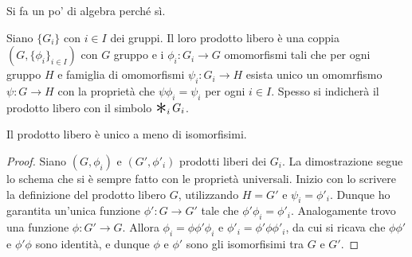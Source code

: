 Si fa un po' di algebra perch\'e s\`i.

\begin{defn}
    Siano $\{G_i\}$ con $i\in I$ dei gruppi. Il loro prodotto libero \`e una coppia $(G, \{\phi_i\}_{i\in I})$ con $G$ gruppo e i $\phi_i\colon G_i\longrightarrow G$ omomorfismi tali che per ogni gruppo $H$ e famiglia di omomorfismi $\psi_i\colon G_i \longrightarrow H$ esista unico un omomrfismo $\psi\colon G\longrightarrow H$ con la propriet\`a che $\psi\phi_i = \psi_i$ per ogni $i\in I$.
    Spesso si indicher\`a il prodotto libero con il simbolo $\Conv_i G_i$.
\end{defn}

\begin{prop}
    Il prodotto libero \`e unico a meno di isomorfisimi.
\end{prop}
\begin{proof}
    Siano $(G, \phi_i)$ e $(G', \phi'_i)$ prodotti liberi dei $G_i$. La dimostrazione segue lo schema che si \`e sempre fatto con le propriet\`a universali. Inizio con lo scrivere la definizione del prodotto libero $G$, utilizzando $H=G'$ e $\psi_i=\phi'_i$. Dunque ho garantita un'unica funzione $\phi'\colon G \longrightarrow G'$ tale che $\phi'\phi_i=\phi'_i$.
    Analogamente trovo una funzione $\phi\colon G' \longrightarrow G$.
    Allora $\phi_i = \phi\phi'\phi_i$ e $\phi'_i=\phi'\phi\phi'_i$, da cui si ricava che $\phi\phi'$ e $\phi'\phi$ sono identit\`a, e dunque $\phi$ e $\phi'$ sono gli isomorfisimi tra $G$ e $G'$.
\end{proof}


